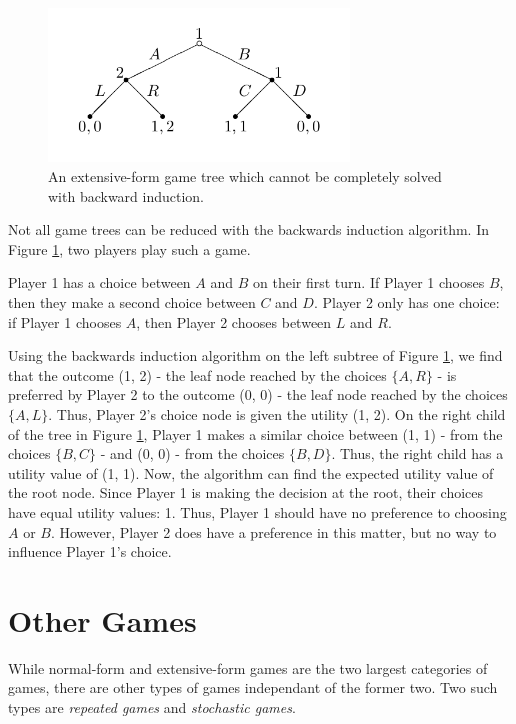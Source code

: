 \begin{figure}[H]
  \centering
  \includegraphics[width=8cm]{figures/NoBackward.png}
  \caption{An extensive-form game tree which cannot be completely solved with backward induction.}
  \label{fig:noBackward}
\end{figure}

Not all game trees can be reduced with the backwards induction algorithm. In Figure \ref{fig:noBackward}, two players play such a game.

\begin{exmp}
  Player 1 has a choice between $A$ and $B$ on their first turn. If Player 1 chooses $B$, then they make a second choice between $C$ and $D$. Player 2 only has one choice: if Player 1 chooses $A$, then Player 2 chooses between $L$ and $R$.
\end{exmp}
Using the backwards induction algorithm on the left subtree of Figure \ref{fig:noBackward}, we find that the outcome (1, 2) - the leaf node reached by the choices $\{A, R\}$ - is preferred by Player 2 to the outcome (0, 0) - the leaf node reached by the choices $\{A, L\}$. Thus, Player 2's choice node is given the utility (1, 2). On the right child of the tree in Figure \ref{fig:noBackward}, Player 1 makes a similar choice between (1, 1) - from the choices $\{B, C\}$ - and (0, 0) - from the choices $\{B, D\}$. Thus, the right child has a utility value of (1, 1). Now, the algorithm can find the expected utility value of the root node. Since Player 1 is making the decision at the root, their choices have equal utility values: 1. Thus, Player 1 should have no preference to choosing $A$ or $B$. However, Player 2 does have a preference in this matter, but no way to influence Player 1's choice.

\section{Other Games}
While normal-form and extensive-form games are the two largest categories of games, there are other types of games independant of the former two. Two such types are \textit{repeated games} and \textit{stochastic games}.\\

